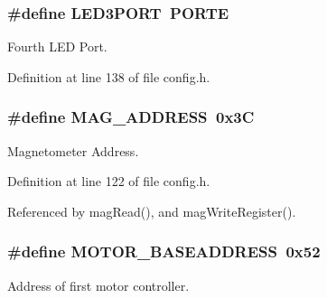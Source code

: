 \hypertarget{group__config_ga63df95c1a0ce0e770964ca35e4032fb6}{
\subsubsection[{L\-E\-D3\-P\-O\-R\-T}]{\setlength{\rightskip}{0pt plus 5cm}\#define L\-E\-D3\-P\-O\-R\-T~P\-O\-R\-T\-E}}\label{group__config_ga63df95c1a0ce0e770964ca35e4032fb6}


Fourth L\-E\-D Port. 



Definition at line 138 of file config.\-h.

\hypertarget{group__config_gade4e63fac819c67040e374f08d2d7230}{
\subsubsection[{M\-A\-G\-\_\-\-A\-D\-D\-R\-E\-S\-S}]{\setlength{\rightskip}{0pt plus 5cm}\#define M\-A\-G\-\_\-\-A\-D\-D\-R\-E\-S\-S~0x3\-C}}\label{group__config_gade4e63fac819c67040e374f08d2d7230}


Magnetometer Address. 



Definition at line 122 of file config.\-h.



Referenced by mag\-Read(), and mag\-Write\-Register().

\hypertarget{group__config_ga6e8ab18bbb1ef1b1e929c627f18224a3}{
\subsubsection[{M\-O\-T\-O\-R\-\_\-\-B\-A\-S\-E\-A\-D\-D\-R\-E\-S\-S}]{\setlength{\rightskip}{0pt plus 5cm}\#define M\-O\-T\-O\-R\-\_\-\-B\-A\-S\-E\-A\-D\-D\-R\-E\-S\-S~0x52}}\label{group__config_ga6e8ab18bbb1ef1b1e929c627f18224a3}


Address of first motor controller. 



